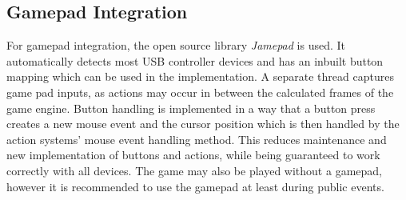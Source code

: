 \subsection{Gamepad Integration}\label{subsec:gamepad-integration}
For gamepad integration, the open source library \textit{Jamepad} is used.
It automatically detects most \gls{USB} controller devices and has an inbuilt button mapping which can be used in the implementation.
A separate thread captures game pad inputs, as actions may occur in between the calculated frames of the game engine.
Button handling is implemented in a way that a button press creates a new mouse event and the cursor position which is then handled by the action
systems' mouse event handling method.
This reduces maintenance and new implementation of buttons and actions, while being guaranteed to work correctly with all devices.
The game may also be played without a gamepad, however it is recommended to use the gamepad at least during public events.
